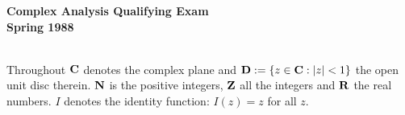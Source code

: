 \documentclass{article}
\begin{document}






\begin{center}\begin{LARGE}
{\bf Complex Analysis Qualifying Exam}\\ 
{\bf Spring 1988}\\ \end{LARGE}
\end{center}
\vspace{0.1in}
\noindent\hrulefill\\

Throughout ${\bf C}$ denotes the complex plane and ${\bf D} := \{z \in {\bf C}: |z| < 1\}$
the open unit disc therein. ${\bf N}$ is the positive integers, ${\bf Z}$ all the
integers and ${\bf R}$ the real numbers. $I$ denotes the identity function:
$I(z) = z$ for all $z$.
\end{document}
